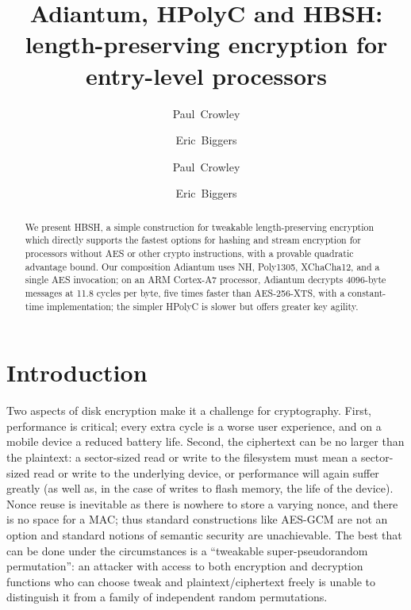 \documentclass[journal=tosc,preprint,floatrow,submission]{iacrtrans}
\title{{Adiantum}, {HPolyC} and {HBSH}: length-preserving encryption for entry-level processors}
\author{Paul~Crowley \and Eric~Biggers}
\institute{Google LLC \\ \email[paulcrowley@google.com,ebiggers@google.com]{{paulcrowley,ebiggers}@google.com}}
\author{Paul~Crowley}
\author{Eric~Biggers}
\affil{Google LLC}
\begin{document}
\maketitle
\iftoggle{iacr}{
    \keywords{strong pseudorandom permutation \and
        variable input length \and
        tweakable encryption \and
        disk encryption}
}{ %
} %

\begin{abstract}
    We present HBSH, a simple construction for tweakable length-preserving encryption which
    directly supports the fastest options for hashing and stream encryption for processors
    without AES or other crypto instructions, with a provable
    quadratic advantage bound. Our composition Adiantum uses NH, Poly1305, XChaCha12,
    and a single AES invocation; on an ARM Cortex-A7 processor, Adiantum decrypts
    4096-byte messages at 11.8 cycles per byte, five times faster than
    AES-256-XTS, with a constant-time implementation; the simpler HPolyC is slower but offers
    greater key agility.
\iftoggle{iacr}{
}{
    This paper: \url{https://ia.cr/2018/720} \\
    Source: \url{https://github.com/google/hpolyc} \\
    Email: \href{mailto:paulcrowley@google.com,ebiggers@google.com}{\{paulcrowley,ebiggers\}@google.com}
}
\end{abstract}

\section{Introduction}
Two aspects of disk encryption make it a challenge for cryptography.  First,
performance is critical; every extra cycle is a worse user experience, and on a mobile device
a reduced battery life.  Second, the ciphertext can be no larger than the plaintext: a sector-sized
read or write to the filesystem must mean a sector-sized read or write to the underlying device,
or performance will again suffer greatly
(as well as, in the case of writes to flash memory, the life of the device).
Nonce reuse is inevitable as there is nowhere to store a varying nonce, and there is no space
for a MAC; thus standard constructions like AES-GCM are not an option and standard notions
of semantic security are unachievable.  The best that can be done under the circumstances is
a ``tweakable super-pseudorandom permutation'': an attacker with access to both encryption
and decryption functions who can choose tweak and plaintext/ciphertext freely is unable to
distinguish it from a family of independent random permutations.
\end{document}
